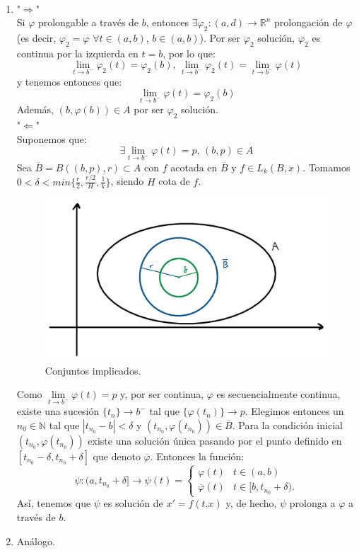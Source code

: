 \documentclass[11pt, a4paper,twoside]{article}
\makeatletter
\theoremstyle{theorem-style}  %
\renewenvironment{proof}[1][\proofname]{\par
	\pushQED{\qed}%
	\normalfont \topsep6\p@\@plus6\p@\relax
	\list{}{%
		\settowidth{\leftmargin}{\quad:\hskip\labelsep}%
		\setlength{\labelwidth}{0pt}%
		\setlength{\itemindent}{-\leftmargin}%
	}%
	\item[\hskip\labelsep\itshape#1\@addpunct{:}]\ignorespaces
}{%
	\popQED\endlist\@endpefalse
}
\theoremstyle{definition-style}
\theoremstyle{example-style}
\providecommand{\abs}[1]{\left\lvert#1\right\rvert} %
\makeatother
\begin{document}
\begin{proof}\ 
	\begin{enumerate} [\quad i)]
		\item "$\Rightarrow$" \\
		Si $\varphi$ prolongable a través de $b$, entonces $\exists \varphi_2 : (a, d) \longrightarrow \mathbb{R}^n$ prolongación de $\varphi$ (es decir, $\varphi_2 = \varphi$ $\forall t \in (a, b)$, $b \in (a, b)$). Por ser $\varphi_2$ solución, $\varphi_2$ es continua por la izquierda en $t = b$, por lo que:
		\[\lim\limits_{t \to b^-} \varphi_2(t) = \varphi_2(b) \text{, } \lim\limits_{t \to b^-} \varphi_2(t) = \lim\limits_{t \to b^-} \varphi(t)\]
		y tenemos entonces que:
		\[\lim\limits_{t \to b^-} \varphi(t) = \varphi_2(b)\]
		Además, $(b, \varphi(b)) \in A$ por ser $\varphi_2$ solución. \\
		"$\Leftarrow$" \\
		Suponemos que:
		\[\exists \lim\limits_{t \to b^-} \varphi(t) = p \text{, } (b, p) \in A\]
		Sea $\overline{B} = B((b, p), r) \subset A$ con $f$ acotada en $\overline{B}$ y $f \in L_k (B, x)$. Tomamos $0 < \delta < min\{\frac{r}{2}, \frac{r/2}{H}, \frac{1}{k}\}$, siendo $H$ cota de $f$.
		
		\begin{figure}[h]
			\centering
			\includegraphics[scale=0.3]{prolongacion}
			\caption{Conjuntos implicados.}
		\end{figure}
		
		Como $\lim\limits_{t \to b^-} \varphi (t) = p$ y, por ser continua, $ \varphi $ es secuencialmente continua, existe una sucesión $\{t_n\} \longrightarrow b^-$ tal que $\{\varphi(t_n)\} \longrightarrow p$. Elegimos entonces un $n_0 \in \mathbb{N}$ tal que $\abs{t_{n_0} - b} < \delta$ y $(t_{n_0}, \varphi (t_{n_0})) \in \overline{B}$. Para la condición inicial $(t_{n_0}, \varphi (t_{n_0}))$ existe una solución única pasando por el punto definido en $[t_{n_0} - \delta, t_{n_0} + \delta]$ que denoto $\overline{\varphi}$. Entonces la función:
		\[\psi: (a, t_{n_0} + \delta] \longrightarrow \psi (t) = \begin{cases}
		\varphi(t) &t \in (a, b) \\ 
		\overline{\varphi} (t) &t \in [b, t_{n_0} + \delta).
		\end{cases}\]
		Así, tenemos que $\psi$ es solución de $x' = f(t. x)$ y, de hecho, $\psi$ prolonga a $\varphi$ a través de $b$.
		\item Análogo.
	\end{enumerate} 
\end{proof}
\end{document}
